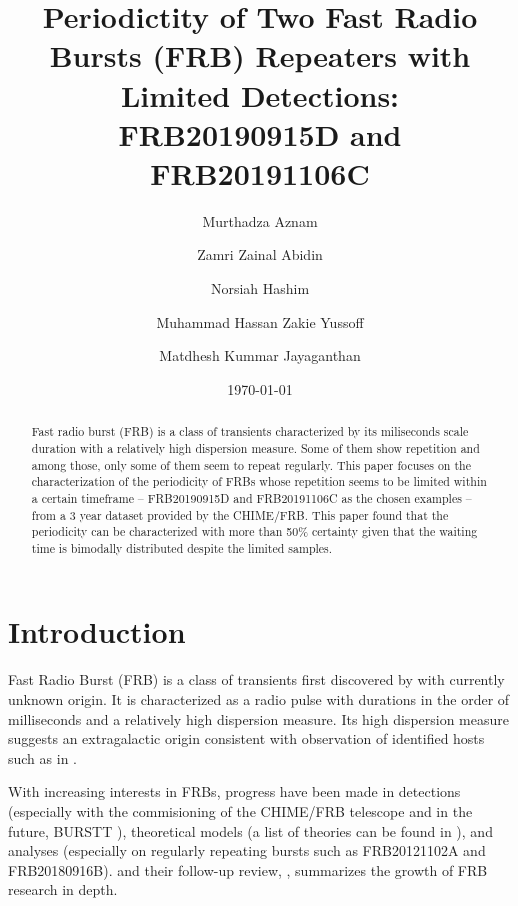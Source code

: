 \documentclass[reprint,amsmath,amssymb,showkeys,prd]{revtex4-2}
\begin{document}

\title{Periodictity of Two Fast Radio Bursts (FRB) Repeaters with Limited Detections: FRB20190915D and FRB20191106C}

\author{Murthadza Aznam}
\author{Zamri Zainal Abidin}
\author{Norsiah Hashim}
\author{Muhammad Hassan Zakie Yussoff}
\author{Matdhesh Kummar Jayaganthan}

\date{\today}

\begin{abstract}
Fast radio burst (FRB) is a class of transients characterized by its miliseconds scale duration with a relatively high dispersion measure. 
Some of them show repetition and among those, only some of them seem to repeat regularly.
This paper focuses on the characterization of the periodicity of FRBs whose repetition seems to be limited within a certain timeframe -- FRB20190915D and FRB20191106C as the chosen examples -- from a 3 year dataset provided by the CHIME/FRB.
This paper found that the periodicity can be characterized with more than 50\% certainty given that the waiting time is bimodally distributed despite the limited samples.

\end{abstract}

\maketitle

\section{Introduction}

Fast Radio Burst (FRB) is a class of transients first discovered by \citet{lorimer_BrightMillisecondRadio_2007} with currently unknown origin.
It is characterized as a radio pulse with durations in the order of milliseconds and a relatively high dispersion measure.
Its high dispersion measure suggests an extragalactic origin consistent with observation of identified hosts such as in \citet{bannister_SingleFastRadio_2019, chatterjee_DirectLocalizationFast_2017, ravi_FastRadioBurst_2019}.

With increasing interests in FRBs, progress have been made in detections (especially with the commisioning of the CHIME/FRB telescope  \cite{thechimefrbcollaborationCHIMEFastRadio2018}  and in the future, BURSTT  \cite{lin_BURSTTBustlingUniverse_2022} ), theoretical models (a list of theories can be found in \citet{platts_LivingTheoryCatalogue_2019}), and analyses (especially on regularly repeating bursts such as FRB20121102A and FRB20180916B).
\citet{petroff_FastRadioBursts_2019} and their follow-up review, \citet{petroff_FastRadioBursts_2022}, summarizes the growth of FRB research in depth.
\end{document}

